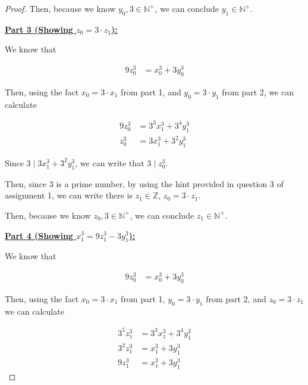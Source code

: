\documentclass[12pt]{article}
\begin{document}
\begin{itemize}
\begin{proof}
        \bigskip

        Then, because we know $y_0, 3 \in \mathbb{N}^+$, we can conclude
        $y_1 \in \mathbb{N}^+$.

        \bigskip

        \underline{\textbf{Part 3 (Showing $z_0 = 3 \cdot z_1$):}}

        \bigskip

        We know that

        \begin{align}
            9z_0^3 &= x_0^3 + 3y_0^3
        \end{align}

        \bigskip

        Then, using the fact $x_0 = 3 \cdot x_1$ from part 1, and
        $y_0 = 3 \cdot y_1$ from part 2, we can calculate

        \begin{align}
            9z_0^3 &= 3^3x_1^3 + 3^4y_1^3\\
            z_0^3 &= 3x_1^3 + 3^2y_1^3
        \end{align}

        \bigskip

        Since $3 \mid 3x_1^3 + 3^2y_1^3$, we can write that $3 \mid z_0^3$.

        \bigskip

        Then, since 3 is a prime number, by using the hint provided in question 3
        of assignment 1, we can write there is $z_1 \in \mathbb{Z}$, $z_0 = 3 \cdot z_1$.

        \bigskip

        Then, because we know $z_0, 3 \in \mathbb{N}^+$, we can conclude
        $z_1 \in \mathbb{N}^+$.

        \bigskip

        \underline{\textbf{Part 4 (Showing $x_1^3 = 9z_1^3 - 3y_1^3$):}}

        \bigskip

        We know that

        \begin{align}
            9z_0^3 &= x_0^3 + 3y_0^3
        \end{align}

        \bigskip

        Then, using the fact $x_0 = 3 \cdot x_1$ from part 1,
        $y_0 = 3 \cdot y_1$ from part 2, and $z_0 = 3 \cdot z_1$ we can calculate

        \begin{align}
            3^5z_1^3 &= 3^3x_1^3 + 3^4y_1^3\\
            3^2z_1^3 &= x_1^3 + 3y_1^3\\
            9z_1^3 &= x_1^3 + 3y_1^3
        \end{align}


\end{proof}
\end{itemize}
\end{document}
